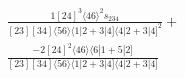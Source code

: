 \documentclass[varwidth, border=5pt]{standalone}
\begin{document}
\begin{my}
$\begin{gathered}
\scriptscriptstyle\frac{1[24]^3⟨46⟩^2s_{234}}{[23][34]⟨56⟩⟨1|2+3|4]⟨4|2+3|4]^2}+\\
\scriptscriptstyle\frac{-2[24]^2⟨46⟩⟨6|1+5|2]}{[23][34]⟨56⟩⟨1|2+3|4]⟨4|2+3|4]}\phantom{+}
\end{gathered}$
\end{my}
\end{document}
